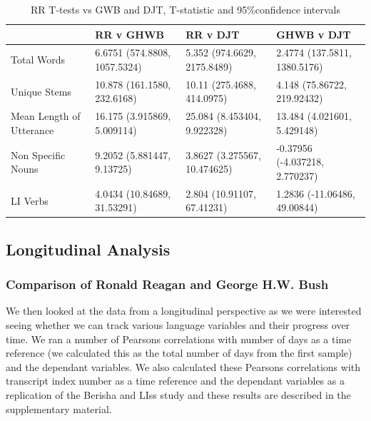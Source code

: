 \documentclass[12pt]{article}
\begin{document}
\begin{table}[H]
	\begin{center}
	\begin{tabular}{ | p{3cm} | p{2.2cm} | p{2.2cm} | p{2.2cm} |}
		\hline
		& RR v GHWB & RR v DJT & GHWB v DJT \\ \hline
		Total Words & 6.6751 (574.8808, 1057.5324) & 5.352 (974.6629, 2175.8489) & 2.4774 (137.5811, 1380.5176) \\ \hline
		Unique Stems & 10.878 (161.1580, 232.6168) & 10.11 (275.4688, 414.0975) & 4.148 (75.86722, 219.92432) \\ \hline
		Mean Length of Utterance & 16.175 (3.915869, 5.009114) & 25.084 (8.453404, 9.922328)  & 13.484 (4.021601, 5.429148) \\ \hline	
		Non Specific Nouns & 9.2052 (5.881447, 9.13725) & 3.8627 (3.275567, 10.474625) & -0.37956 (-4.037218, 2.770237) \\ \hline
		LI Verbs & 4.0434 (10.84689, 31.53291) & 2.804 (10.91107, 67.41231) & 1.2836 (-11.06486, 49.00844)\\ \hline
	\end{tabular}
	\caption{\label{tab:table-name}RR T-tests vs GWB and DJT, T-statistic and 95\%confidence intervals}
	\end{center} 
\end{table}

\subsection{Longitudinal Analysis}
\subsubsection{Comparison of Ronald Reagan and George H.W. Bush}
We then looked at the data from a longitudinal perspective as we were interested seeing whether we can track various language variables and their progress over time. We ran a number of Pearsons correlations with number of days as a time reference (we calculated this as the total number of days from the first sample) and the dependant variables. We also calculated these Pearsons correlations with transcript index number as a time reference and the dependant variables as a replication of the Berisha and LIss study \cite{Berisha2015} and these results are described in the supplementary material.
\end{document}
